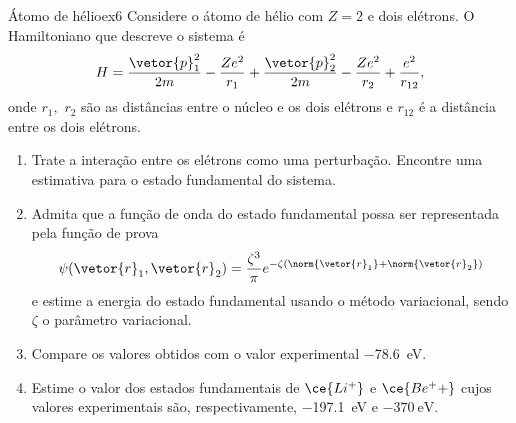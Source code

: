 \begin{exercício}{Átomo de hélio}{ex6}
   Considere o átomo de hélio com \(Z = 2\) e dois elétrons. O Hamiltoniano que descreve o sistema é
   \begin{equation*}
      H = \frac{\vetor{p}_1^2}{2m} - \frac{Ze^2}{r_1} + \frac{\vetor{p}_2^2}{2m} - \frac{Z e^2}{r_2} + \frac{e^2}{r_{12}},
   \end{equation*}
   onde \(r_1,\) \(r_2\) são as distâncias entre o núcleo e os dois elétrons e \(r_{12}\) é a distância entre os dois elétrons.
   \begin{enumerate}[label=(\alph*)]
       \item Trate a interação entre os elétrons como uma perturbação. Encontre uma estimativa para o estado fundamental do sistema.
       \item Admita que a função de onda do estado fundamental possa ser representada pela função de prova
          \begin{equation*}
             \psi(\vetor{r}_1, \vetor{r}_2) = \frac{\zeta^3}{\pi} e^{- \zeta(\norm{\vetor{r}_1} + \norm{\vetor{r}_2})}
          \end{equation*}
          e estime a energia do estado fundamental usando o método variacional, sendo \(\zeta\) o parâmetro variacional.
       \item Compare os valores obtidos com o valor experimental \SI{-78.6}{\eV}.
       \item Estime o valor dos estados fundamentais de \(\ce{Li^+}\) e \(\ce{Be^++}\) cujos valores experimentais são, respectivamente, \SI{-197.1}{\eV} e \(\SI{-370}{\eV}.\)
   \end{enumerate}
\end{exercício}
